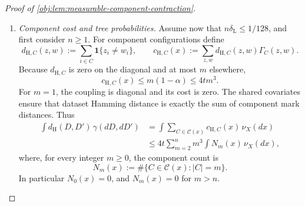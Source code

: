 \begin{proof}[Proof of \cref{obj:lem:measurable-component-contraction}]
\begin{enumerate}
The component marginal identities and factorization give, for every \(x,z,w\),
\[
\begin{aligned}
\sum_w p_{\mathrm{joint}}(x,z,w)
&=\prod_{C\in\mathscr C(x)}Q_C(\{z|_C\})\\
&=E_\lambda\prod_{i=1}^n
 \frac{L_\lambda(x_i,U_i(z),V_{Y,i}(z))}{4},
\end{aligned}
\qquad
\sum_zp_{\mathrm{joint}}(x,z,w)=4^{-n}.
\]
In particular, \(\gamma_x\) is a probability measure.

Define the shared covariate law and integrated coupling by
\[
\nu_X:=\bigotimes_{i=1}^n\operatorname{Unif}[0,1],
\qquad
\gamma(\mathcal E)
:=
\int_{[0,1]^n}\gamma_x(\mathcal E)\,\nu_X(dx)
\]
for every measurable dataset-pair event \(\mathcal E\).
The alternatives and null have this common covariate law. Integrating the first conditional marginal and interchanging the finite sign average with the integral yields the uniform mixture of alternative product laws; integrating the second yields the fair-null product law. Explicitly, with
\[
\operatorname{pr}_1(D,D')=D,
\qquad
\operatorname{pr}_2(D,D')=D',
\]
we obtain
\[
(\operatorname{pr}_1)_\#\gamma=Q_n,
\qquad
(\operatorname{pr}_2)_\#\gamma=(P_0^{\mathrm{obs}})^{\otimes n},
\qquad
\gamma(\mathcal O^n\times\mathcal O^n)=1.
\]
For \(n=0\), the mark space and dataset space each have one element; the empty component product gives the unit mass on the pair of empty datasets.

\item \textit{Component cost and tree probabilities.}
Assume now that \(n\delta_{\mathrm L}\le1/128\), and first consider \(n\ge1\). For component configurations define
\[
d_{\mathrm H,C}(z,w)
:=\sum_{i\in C}\mathbf 1\{z_i\ne w_i\},
\qquad
c_{\mathrm H,C}(x)
:=\sum_{z,w}d_{\mathrm H,C}(z,w)\Gamma_C(z,w).
\]
Because \(d_{\mathrm H,C}\) is zero on the diagonal and at most \(m\) elsewhere,
\[
c_{\mathrm H,C}(x)
\le m(1-\alpha)
\le4tm^3.
\]
For \(m=1\), the coupling is diagonal and its cost is zero. The shared covariates ensure that dataset Hamming distance is exactly the sum of component mark distances. Thus
\[
\begin{aligned}
\int d_{\mathrm H}(D,D')\,\gamma(dD,dD')
&=\int\sum_{C\in\mathscr C(x)}c_{\mathrm H,C}(x)\,\nu_X(dx)\\
&\le4t\sum_{m=2}^n m^3\int N_m(x)\,\nu_X(dx),
\end{aligned}
\]
where, for every integer \(m\ge0\), the component count is
\[
N_m(x)
:=\#\{C\in\mathscr C(x):|C|=m\}.
\]
In particular \(N_0(x)=0\), and \(N_m(x)=0\) for \(m>n\).


\end{enumerate}
\end{proof}
